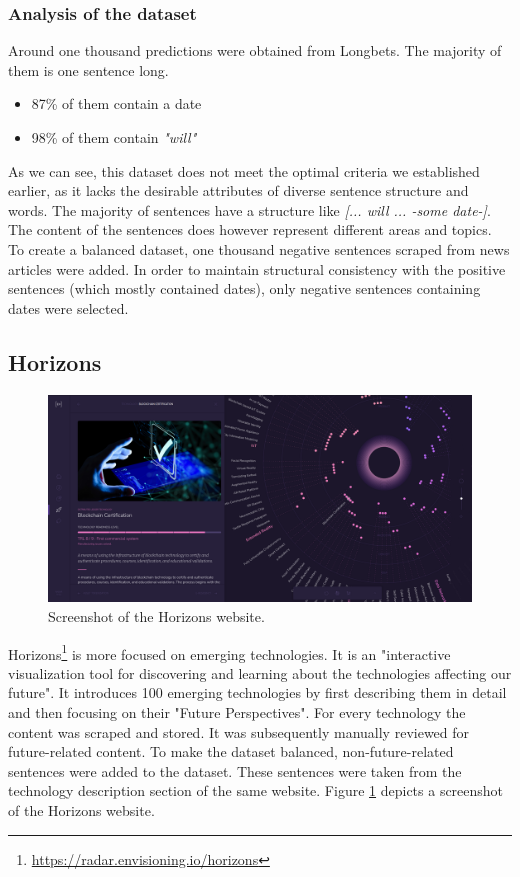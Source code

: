 \documentclass[a4paper,10pt]{report}
\begin{document}
\subsubsection{Analysis of the dataset}
Around one thousand predictions were obtained from Longbets. The majority of them is one sentence long.
\begin{itemize}
  \item 87\% of them contain a date
  \item 98\% of them contain \textit{"will"}
\end{itemize}

As we can see, this dataset does not meet the optimal criteria we established earlier, as it lacks the desirable attributes of diverse sentence structure and words. The majority of sentences have a structure like \textit{[... will ... -some date-]}. The content of the sentences does however represent different areas and topics.     
To create a balanced dataset, one thousand negative sentences scraped from news articles were added. In order to maintain structural consistency with the positive sentences (which mostly contained dates), only negative sentences containing dates were selected.



\subsection{Horizons}
\begin{figure}
  \centering
  \includegraphics[width=16cm]{img/horizons.png}
  \caption{Screenshot of the Horizons website.}
  \label{fig:horizons}
\end{figure}
Horizons\footnote{\url{https://radar.envisioning.io/horizons}} is more focused on emerging technologies. It is an "interactive visualization tool for discovering and learning about the technologies affecting our future". It introduces 100 emerging technologies by first describing them in detail and then focusing on their "Future Perspectives". For every technology the content was scraped and stored. It was subsequently manually reviewed for future-related content.     
To make the dataset balanced, non-future-related sentences were added to the dataset. These sentences were taken from the technology description section of the same website. Figure \ref{fig:horizons} depicts a screenshot of the Horizons website.
\end{document}
